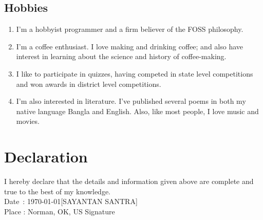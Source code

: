 \documentclass{article}
\begin{document}
\subsection{Hobbies}
\begin{enumerate}[label=(\alph*)]
	\item I'm a hobbyist programmer and a firm believer of the FOSS philosophy.
	\item I'm a coffee enthusiast. I love making and drinking coffee; and also have interest in learning about the science and history of
	      coffee-making.
	\item I like to participate in quizzes, having competed in state level competitions and won awards in district level competitions.
	\item I'm also interested in literature. I've published several poems in both my native language Bangla and English. Also, like most
	      people, I love music and movies.
\end{enumerate}

\section{Declaration}
I hereby declare that the details and information given above are complete and true to the best of my knowledge.
\vspace*{2cm} \\
Date \,: \today \hfill [SAYANTAN SANTRA] \\
Place  : Norman, OK, US \hfill Signature \hspace{1cm}
\end{document}
